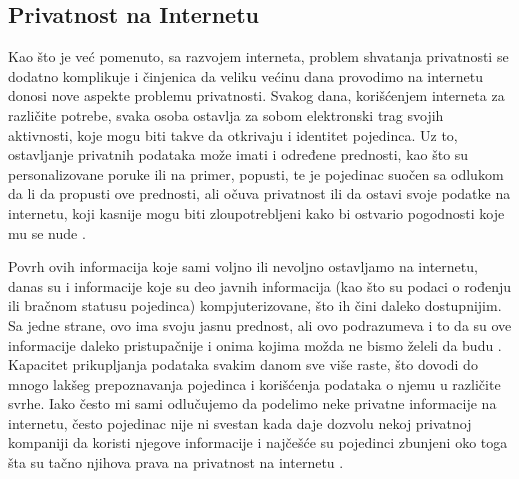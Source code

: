 \documentclass[a4paper]{article}
\begin{document}
\subsection{Privatnost na Internetu}
\label{subsec:privatnostNaInternetu}
Kao što je već pomenuto, sa razvojem interneta, problem shvatanja privatnosti se dodatno komplikuje  i činjenica  da  veliku  većinu  dana  provodimo  na  internetu  donosi nove  aspekte  problemu  privatnosti. Svakog  dana, korišćenjem interneta za različite potrebe, svaka osoba ostavlja za sobom elektronski trag svojih aktivnosti, koje mogu biti takve da otkrivaju i identitet pojedinca. Uz to, ostavljanje privatnih podataka može imati i određene prednosti, kao što su personalizovane poruke ili na primer, popusti, te je pojedinac suočen sa odlukom da li da propusti ove prednosti, ali očuva privatnost ili da ostavi svoje podatke na internetu, koji kasnije mogu biti zloupotrebljeni kako bi ostvario pogodnosti koje mu se nude \cite{renata}.
\par Povrh ovih informacija koje sami voljno ili nevoljno ostavljamo na internetu, danas su i informacije koje su deo javnih informacija (kao što su podaci o rođenju ili bračnom statusu pojedinca) kompjuterizovane, što ih čini daleko dostupnijim. Sa jedne strane, ovo ima svoju jasnu prednost, ali ovo podrazumeva i to da su ove informacije daleko pristupačnije i onima kojima možda ne bismo želeli da budu \cite{ethics}. Kapacitet prikupljanja podataka svakim danom sve više raste, što dovodi  do mnogo lakšeg prepoznavanja pojedinca i korišćenja podataka o njemu u različite svrhe. Iako često mi sami odlučujemo da podelimo neke privatne informacije na internetu, često pojedinac nije ni svestan kada daje dozvolu nekoj privatnoj kompaniji da koristi njegove informacije i najčešće su pojedinci zbunjeni oko toga šta su tačno njihova prava na privatnost na internetu \cite{renata}.
\end{document}
